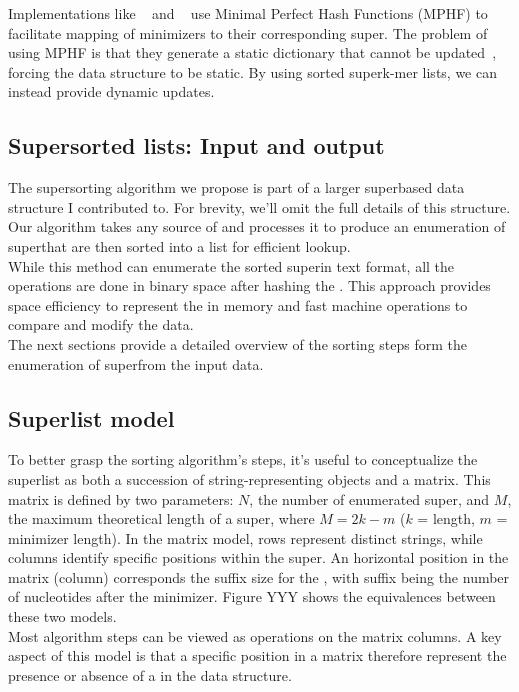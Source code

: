 Implementations like \blight~\cite{blight} and \ssh~\cite{sshash} use Minimal Perfect Hash Functions (MPHF) to facilitate mapping of minimizers to their corresponding super\kmers. The problem of using MPHF is that they generate a static dictionary that cannot be updated~\cite{smsketch}, forcing the data structure to be static. By using sorted superk-mer lists, we can instead provide dynamic updates.

\subsection{Super\kmer sorted lists: Input and output}
The super\kmer sorting algorithm we propose is part of a larger super\kmer based data structure I contributed to. For brevity, we'll omit the full details of this structure. \\
Our algorithm takes any source of \kmers and processes it to produce an enumeration of super\kmers that are then sorted into a list for efficient lookup.\\
While this method can enumerate the sorted super\kmers in text format, all the operations are done in binary space after hashing the \kmers. This approach provides space efficiency to represent the \kmers in memory and fast machine operations to compare and modify the data.\\
The next sections provide a detailed overview of the sorting steps form the enumeration of super\kmer from the input data.

\subsection{Super\kmer list model}
To better grasp the sorting algorithm's steps, it's useful to conceptualize the super\kmer list as both a succession of string-representing objects and a matrix. This matrix is defined by two parameters: $N$, the number of enumerated super\kmers, and $M$, the maximum theoretical length of a super\kmer, where $M = 2k - m$ ($k$ = \kmer length, $m$ = minimizer length). In the matrix model, rows represent distinct strings, while columns identify specific positions within the super\kmer. An horizontal position in the matrix (column) corresponds the suffix size for the \kmer, with suffix being the number of nucleotides after the minimizer. Figure YYY shows the equivalences between these two models.\\
Most algorithm steps can be viewed as operations on the matrix columns. A key aspect of this model is that a specific position in a matrix therefore represent the presence or absence of a \kmer in the data structure.

